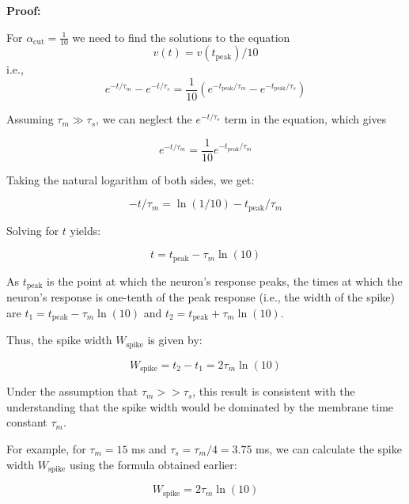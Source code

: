 \textbf{{Proof:}}

For $\alpha_{\text{{cut}}} = \frac{1}{10}$ we need to find the solutions to the equation
\begin{equation}
    v(t) = v(t_{\text{{peak}}})/10
\end{equation}
i.e.,
\begin{equation}
e^{-t/\tau_m} - e^{-t/\tau_s} = \frac{1}{10}\left(e^{-t_{\text{{peak}}}/\tau_m} - e^{-t_{\text{{peak}}}/\tau_s}\right)
\end{equation}

Assuming $\tau_m \gg \tau_s$, we can neglect the $e^{-t/\tau_s}$ term in the equation, which gives

\begin{equation}
e^{-t/\tau_m} = \frac{1}{10} e^{-t_{\text{{peak}}}/\tau_m}
\end{equation}

Taking the natural logarithm of both sides, we get:

\begin{equation}
-t/\tau_m = \ln(1/10) - t_{\text{{peak}}}/\tau_m
\end{equation}

Solving for $t$ yields:

\begin{equation}
t = t_{\text{{peak}}} - \tau_m \ln(10)
\end{equation}

As $t_{\text{{peak}}}$ is the point at which the neuron's response peaks, the times at which the neuron's response is one-tenth of the peak response (i.e., the width of the spike) are $t_1 = t_{\text{{peak}}} - \tau_m \ln(10)$ and $t_2 = t_{\text{{peak}}} + \tau_m \ln(10)$.

Thus, the spike width $W_{\text{{spike}}}$ is given by:

\begin{equation}
W_{\text{{spike}}} = t_2 - t_1 = 2\tau_m \ln(10)
\end{equation}

Under the assumption that $\tau_m >> \tau_s$, this result is consistent with the understanding that the spike width would be dominated by the membrane time constant $\tau_m$. 

For example, for $\tau_m = 15$ ms and $\tau_s = \tau_m / 4 = 3.75$ ms, we can calculate the spike width $W_{\text{{spike}}}$ using the formula obtained earlier:

\begin{equation}
W_{\text{{spike}}} = 2\tau_m \ln(10)
\end{equation}

